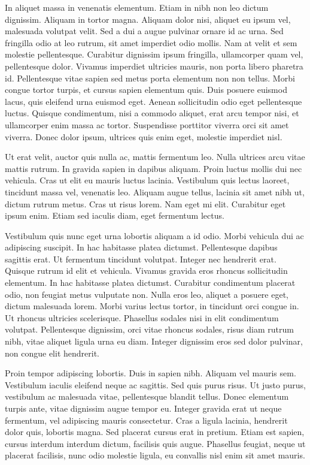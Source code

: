 \documentclass[journal]{IEEEtran}
\begin{document}
In aliquet massa in venenatis elementum. Etiam in nibh non leo dictum dignissim. Aliquam in tortor magna. Aliquam dolor nisi, aliquet eu ipsum vel, malesuada volutpat velit. Sed a dui a augue pulvinar ornare id ac urna. Sed fringilla odio at leo rutrum, sit amet imperdiet odio mollis. Nam at velit et sem molestie pellentesque. Curabitur dignissim ipsum fringilla, ullamcorper quam vel, pellentesque dolor. Vivamus imperdiet ultricies mauris, non porta libero pharetra id. Pellentesque vitae sapien sed metus porta elementum non non tellus. Morbi congue tortor turpis, et cursus sapien elementum quis. Duis posuere euismod lacus, quis eleifend urna euismod eget. Aenean sollicitudin odio eget pellentesque luctus. Quisque condimentum, nisi a commodo aliquet, erat arcu tempor nisi, et ullamcorper enim massa ac tortor. Suspendisse porttitor viverra orci sit amet viverra. Donec dolor ipsum, ultrices quis enim eget, molestie imperdiet nisl.

Ut erat velit, auctor quis nulla ac, mattis fermentum leo. Nulla ultrices arcu vitae mattis rutrum. In gravida sapien in dapibus aliquam. Proin luctus mollis dui nec vehicula. Cras ut elit eu mauris luctus lacinia. Vestibulum quis lectus laoreet, tincidunt massa vel, venenatis leo. Aliquam augue tellus, lacinia sit amet nibh ut, dictum rutrum metus. Cras ut risus lorem. Nam eget mi elit. Curabitur eget ipsum enim. Etiam sed iaculis diam, eget fermentum lectus.

Vestibulum quis nunc eget urna lobortis aliquam a id odio. Morbi vehicula dui ac adipiscing suscipit. In hac habitasse platea dictumst. Pellentesque dapibus sagittis erat. Ut fermentum tincidunt volutpat. Integer nec hendrerit erat. Quisque rutrum id elit et vehicula. Vivamus gravida eros rhoncus sollicitudin elementum. In hac habitasse platea dictumst. Curabitur condimentum placerat odio, non feugiat metus vulputate non. Nulla eros leo, aliquet a posuere eget, dictum malesuada lorem. Morbi varius lectus tortor, in tincidunt orci congue in. Ut rhoncus ultricies scelerisque. Phasellus sodales nisi in elit condimentum volutpat. Pellentesque dignissim, orci vitae rhoncus sodales, risus diam rutrum nibh, vitae aliquet ligula urna eu diam. Integer dignissim eros sed dolor pulvinar, non congue elit hendrerit.

Proin tempor adipiscing lobortis. Duis in sapien nibh. Aliquam vel mauris sem. Vestibulum iaculis eleifend neque ac sagittis. Sed quis purus risus. Ut justo purus, vestibulum ac malesuada vitae, pellentesque blandit tellus. Donec elementum turpis ante, vitae dignissim augue tempor eu. Integer gravida erat ut neque fermentum, vel adipiscing mauris consectetur. Cras a ligula lacinia, hendrerit dolor quis, lobortis magna. Sed placerat cursus erat in pretium. Etiam est sapien, cursus interdum interdum dictum, facilisis quis augue. Phasellus feugiat, neque ut placerat facilisis, nunc odio molestie ligula, eu convallis nisl enim sit amet mauris.
\end{document}
